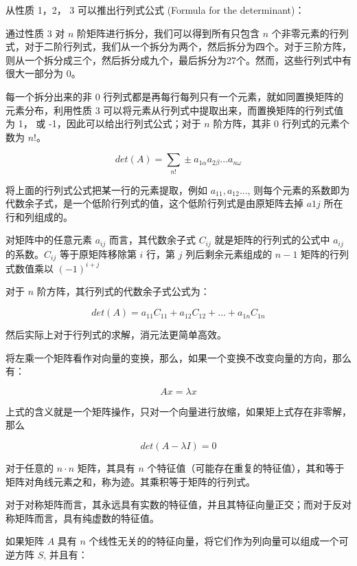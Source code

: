 \documentclass[
  letterpaper,
  DIV=11,
  numbers=noendperiod]{scrartcl}
\begin{document}
从性质 1，2， 3 可以推出行列式公式 (Formula for the determinant)：

通过性质 3 对 \(n\) 阶矩阵进行拆分，我们可以得到所有只包含 \(n\)
个非零元素的行列式，对于二阶行列式，我们从一个拆分为两个，然后拆分为四个。对于三阶方阵，则从一个拆分成三个，然后拆分成九个，最后拆分为27个。然而，这些行列式中有很大一部分为
0。

每一个拆分出来的非 0
行列式都是再每行每列只有一个元素，就如同置换矩阵的元素分布，利用性质 3
可以将元素从行列式中提取出来，而置换矩阵的行列式值为 1， 或
-1，因此可以给出行列式公式；对于 \(n\) 阶方阵，其非 0 行列式的元素个数为
\(n!\)。

\[
det(A) = \sum_{n!}\pm{a_{1\alpha}a_{2\beta}...a_{n\omega}}
\]

将上面的行列式公式把某一行的元素提取，例如 \(a_{11}, a_{12}...\),
则每个元素的系数即为代数余子式，是一个低阶行列式的值，这个低阶行列式是由原矩阵去掉
\(a1j\) 所在行和列组成的。

对矩阵中的任意元素 \(a_{ij}\) 而言，其代数余子式 \(C_{ij}\)
就是矩阵的行列式的公式中 \(a_{ij}\) 的系数。\(C_{ij}\) 等于原矩阵移除第
\(i\) 行，第 \(j\) 列后剩余元素组成的 \(n - 1\) 矩阵的行列式数值乘以
\((-1)^{i + j}\)

对于 \(n\) 阶方阵，其行列式的代数余子式公式为：

\[
det(A) = a_{11}C_{11} + a_{12}C_{12} + \dots + a_{1n}C_{1n}
\]

然后实际上对于行列式的求解，消元法更简单高效。

将左乘一个矩阵看作对向量的变换，那么，如果一个变换不改变向量的方向，那么有：

\[
Ax = \lambda x
\]

上式的含义就是一个矩阵操作，只对一个向量进行放缩，如果矩上式存在非零解，那么

\[
det(A- \lambda I) = 0
\]

对于任意的 \(n \cdot n\) 矩阵，其具有 \(n\)
个特征值（可能存在重复的特征值），其和等于矩阵对角线元素之和，称为迹。其乘积等于矩阵的行列式。

对于对称矩阵而言，其永远具有实数的特征值，并且其特征向量正交；而对于反对称矩阵而言，具有纯虚数的特征值。

如果矩阵 \(A\) 具有 \(n\)
个线性无关的的特征向量，将它们作为列向量可以组成一个可逆方阵 \(S\),
并且有：
\end{document}
